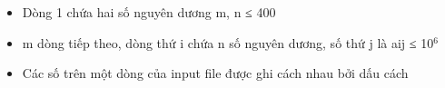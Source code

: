 \begin{itemize}
	\item Dòng 1 chứa hai số nguyên dương m, n ≤ 400
	\item m dòng tiếp theo, dòng thứ i chứa n số nguyên dương, số thứ j là aij ≤ 10$^6$
	\item Các số trên một dòng của input file được ghi cách nhau bởi dấu cách
\end{itemize}